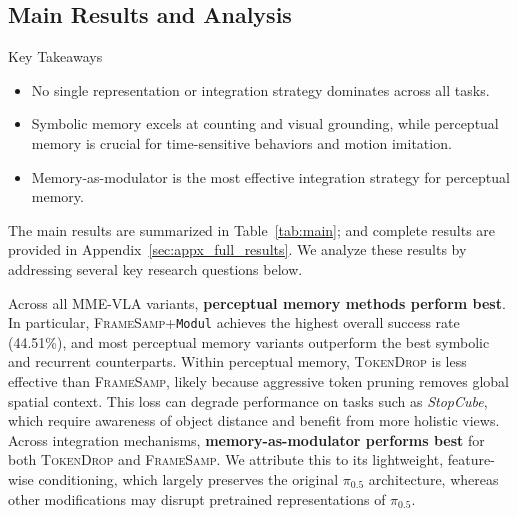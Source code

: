 
\subsection{Main Results and Analysis}



\begin{AIbox}{Key Takeaways}
\begin{itemize}[leftmargin=*,itemsep=4pt,topsep=0pt]
    \item No single representation or integration strategy dominates across all tasks.
    \item Symbolic memory excels at counting and visual grounding, while perceptual memory is crucial for time-sensitive behaviors and motion imitation.
    \item Memory-as-modulator is the most effective integration strategy for perceptual memory.
\end{itemize}
\end{AIbox}




The main results are summarized in Table~\ref{tab:main}; and complete results are provided in Appendix~\ref{sec:appx_full_results}. We analyze these results by addressing several key research questions below.

Across all MME-VLA variants, \textbf{perceptual memory methods perform best}. In particular, \textsc{FrameSamp}+\texttt{Modul} achieves the highest overall success rate (44.51\%), and most perceptual memory variants outperform the best symbolic and recurrent counterparts. Within perceptual memory, \textsc{TokenDrop} is less effective than \textsc{FrameSamp}, likely because aggressive token pruning removes global spatial context. This loss can degrade performance on tasks such as \textit{StopCube}, which require awareness of object distance and benefit from more holistic views.
Across integration mechanisms, \textbf{memory-as-modulator performs best} for both \textsc{TokenDrop} and \textsc{FrameSamp}. We attribute this to its lightweight, feature-wise conditioning, which largely preserves the original $\pi_{0.5}$ architecture, whereas other   modifications may disrupt pretrained representations of $\pi_{0.5}$.

